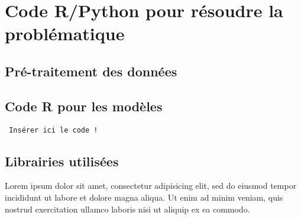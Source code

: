 \documentclass[a4paper, oneside, french, 12pt, final]{extreport}
\begin{document}
\newpage
\appendix
{}

\chapter{Code R/Python pour résoudre la problématique}
\label{chap:appendix}


\section{Pré-traitement des données}
\section{Code R pour les modèles}

\begin{verbatim}
 Insérer ici le code !
 \end{verbatim}

\section{Librairies utilisées}

Lorem ipsum dolor sit amet, consectetur adipisicing elit, sed do eiusmod
tempor incididunt ut labore et dolore magna aliqua. Ut enim ad minim veniam,
quis nostrud exercitation ullamco laboris nisi ut aliquip ex ea commodo.




%



\cleardoublepage%


\printglossaries
\printindex


\end{document}
